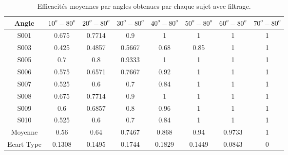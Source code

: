 \documentclass[letterpaper, twoside, 12pt, memoire, creativecommons, hyperref]{thETS}
\begin{document}
\begin{table}[ht]
	\caption{Efficacités moyennes par angles obtenues par chaque sujet avec filtrage. }
		\begin{tabular}{|c|c|c|c|c|c|c|c|}
		\hline
			Angle & $10^{o}-80^{o}$ & $20^{o}-80^{o}$ & $30^{o}-80^{o}$ & $40^{o}-80^{o}$ & $50^{o}-80^{o}$ & $60^{o}-80^{o}$ & $70^{o}-80^{o}$ \\
	    \hline
	    		S001 & 0.675 & 0.7714 & 0.9 & 1 & 1 & 1 & 1\\
	    \hline
	    		S003  & 0.425 & 0.4857 & 0.5667 & 0.68 & 0.85 & 1 & 1\\
	    \hline
	    		S005  & 0.7 & 0.8 & 0.9333 & 1 & 1 & 1 & 1\\
	    \hline
	    		S006 & 0.575 & 0.6571 & 0.7667 & 0.92 & 1 & 1 & 1\\
	    \hline
	    		S007 & 0.525 & 0.6 & 0.7 & 0.84 & 1 & 1 & 1\\
	    \hline
	    		S008 & 0.675 & 0.7714 & 0.9 & 1 & 1 & 1 & 1\\
	    \hline
	    		S009 & 0.6 & 0.6857 & 0.8 & 0.96 & 1 & 1 & 1\\
	    \hline
	    		S010 & 0.525 & 0.6 & 0.7 & 0.84 & 1 & 1 & 1\\
	    \hline
	    		Moyenne  & 0.56 & 0.64 & 0.7467 & 0.868 & 0.94 & 0.9733 & 1\\
	    \hline
	    		Ecart Type & 0.1308 & 0.1495 & 0.1744 & 0.1829 & 0.1449 & 0.0843 & 0\\
	    \hline
		\end{tabular}
	\label{tab:effinterval}
\end{table}
\end{document}
